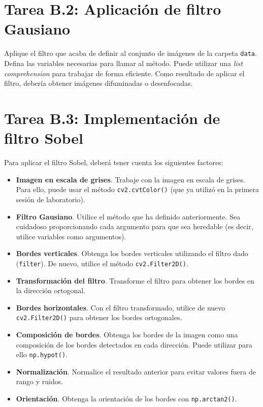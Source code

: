 \section*{Tarea B.2: Aplicación de filtro Gausiano}
{}

Aplique el filtro que acaba de definir al conjunto de imágenes de la carpeta \texttt{data}. Defina las variables necesarias para llamar al método. Puede utilizar una \textit{list comprehension} para trabajar de forma eficiente. Como resultado de aplicar el filtro, debería obtener imágenes difuminadas o desenfocadas.

\section*{Tarea B.3: Implementación de filtro Sobel}
{}

Para aplicar el filtro Sobel, deberá tener cuenta los siguientes factores:

\begin{itemize}
    \item \textbf{Imagen en escala de grises}. Trabaje con la imagen en escala de grises. Para ello, puede usar el método \texttt{cv2.cvtColor()} (que ya utilizó en la primera sesión de laboratorio).
    
    \item \textbf{Filtro Gausiano}. Utilice el método que ha definido anteriormente. Sea cuidadoso proporcionando cada argumento para que sea heredable (es decir, utilice variables como argumentos).
    
    \item \textbf{Bordes verticales}. Obtenga los bordes verticales utilizando el filtro dado (\texttt{filter}). De nuevo, utilice el método \texttt{cv2.Filter2D()}.
    \item \textbf{Transformación del filtro}. Transforme el filtro para obtener los bordes en la dirección ortogonal.
    \item \textbf{Bordes horizontales}. Con el filtro transformado, utilice de nuevo \texttt{cv2.Filter2D()} para obtener los bordes ortogonales.
    \item \textbf{Composición de bordes}. Obtenga los bordes de la imagen como una composición de los bordes detectados en cada dirección. Puede utilizar para ello \texttt{np.hypot()}.
    \item \textbf{Normalización}. Normalice el resultado anterior para evitar valores fuera de rango y ruidos.
    \item \textbf{Orientación}. Obtenga la orientación de los bordes con \texttt{np.arctan2()}.
\end{itemize}

